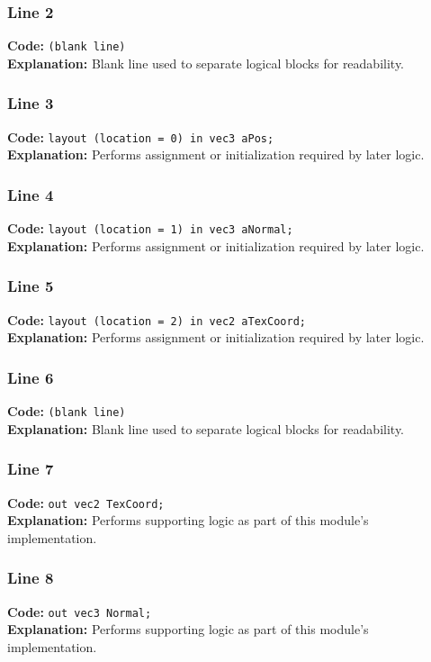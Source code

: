 \documentclass[11pt,a4paper]{article}
\begin{document}
\subsubsection*{Line 2}
\textbf{Code:} \texttt{(blank line)}\\
\textbf{Explanation:} Blank line used to separate logical blocks for readability.

\subsubsection*{Line 3}
\textbf{Code:} \verb|layout (location = 0) in vec3 aPos;|\\
\textbf{Explanation:} Performs assignment or initialization required by later logic.

\subsubsection*{Line 4}
\textbf{Code:} \verb|layout (location = 1) in vec3 aNormal;|\\
\textbf{Explanation:} Performs assignment or initialization required by later logic.

\subsubsection*{Line 5}
\textbf{Code:} \verb|layout (location = 2) in vec2 aTexCoord;|\\
\textbf{Explanation:} Performs assignment or initialization required by later logic.

\subsubsection*{Line 6}
\textbf{Code:} \texttt{(blank line)}\\
\textbf{Explanation:} Blank line used to separate logical blocks for readability.

\subsubsection*{Line 7}
\textbf{Code:} \verb|out vec2 TexCoord;|\\
\textbf{Explanation:} Performs supporting logic as part of this module's implementation.

\subsubsection*{Line 8}
\textbf{Code:} \verb|out vec3 Normal;|\\
\textbf{Explanation:} Performs supporting logic as part of this module's implementation.
\end{document}
